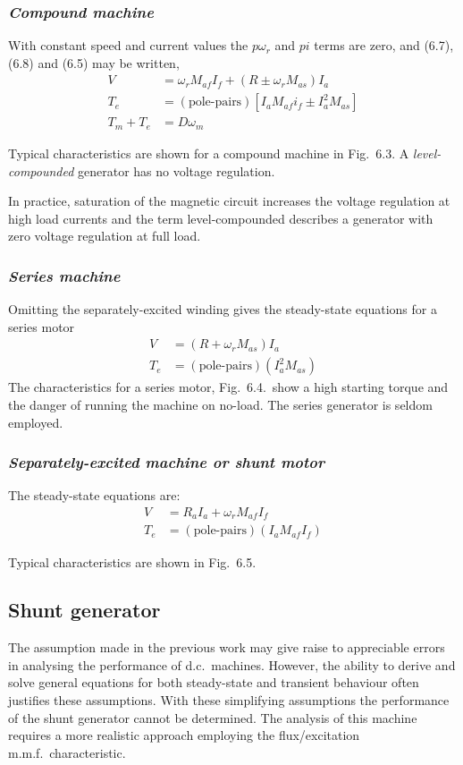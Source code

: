 \documentclass[a4paper,numbers=noenddot,12pt]{scrbook}
\begin{document}
\subsubsection{\textit{Compound machine}}
With constant speed and current values the $p \omega_r$ and $p i$ terms are zero, and (6.7), (6.8) and (6.5) may be written,
\begin{align}
    V & =\omega_r M_{af} I_f + (R \pm \omega_r M_{as}) I_a \\[2ex]
    T_e & = (\text{pole-pairs})[I_a M_{af} i_f \pm I_a^2 M_{as}] \\[2ex]
    T_m + T_e & = D \omega_m
\end{align}

Typical characteristics are shown for a compound machine in Fig.\ 6.3. A \textit{level-compounded} generator has  no voltage regulation.

\noindent In practice, saturation of the magnetic circuit increases the voltage regulation at high load currents and the term level-compounded describes a generator with zero voltage regulation at full load.

\subsubsection{\textit{Series machine}}
Omitting the separately-excited winding gives the steady-state equations for a series motor
\begin{align}
    V & = (R + \omega_r M_{as}) I_a\\[2ex]
    T_e & = (\text{pole-pairs})(I_a^2 M_{as})
    \label{}
\end{align}
The characteristics for a series motor, Fig.\ 6.4.\ show a high starting torque and the danger of running the machine on no-load. The series generator is seldom employed.

\subsubsection{\textit{Separately-excited machine or shunt motor}}
The steady-state equations are:
\begin{align}
    V & = R_a I_a + \omega_r M_{af} I_f\\[2ex]
    T_e & = (\text{pole-pairs})(I_a M_{af} I_f)
    \label{}
    \label{}
\end{align}

Typical characteristics are shown in Fig.\ 6.5.

\subsection{Shunt generator}
The assumption made in the previous work may give raise to appreciable errors in analysing the performance of d.c.\ machines. However, the ability to derive and solve general equations for both steady-state and transient behaviour often justifies these assumptions. With these simplifying assumptions the performance of the shunt generator cannot be determined. The analysis of this machine requires a more realistic approach employing the
flux/excitation m.m.f.\ characteristic.
\end{document}
